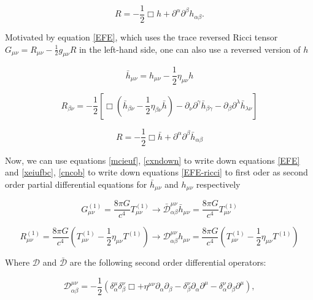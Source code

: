\begin{equation}\label{cxndown}
R = -\frac{1}{2} \Box h + \partial^{\alpha}\partial^{\beta} h_{\alpha \beta}.
\end{equation}

Motivated by equation \ref{EFE},  which uses the trace reversed Ricci tensor $G_{\mu \nu}= R_{\mu\nu}-\frac{1}{2} g_{\mu\nu} R$ in the left-hand side, one can also use a reversed version of $h$


\begin{equation}
\bar{h}_{\mu\nu} = h_{\mu\nu}-\frac{1}{2} \eta_{\mu\nu} h
\end{equation}

\begin{equation}\label{xeiufbc}
R_{\beta \nu} = -\frac{1}{2} [ \Box( \bar{h}_{\beta \nu}-\frac{1}{2} \eta_{\beta \nu} \bar{h} ) - \partial_{\nu} \partial^{\gamma} \bar{h}_{\beta \gamma} - \partial_{\beta} \partial^{\lambda} \bar{h}_{\lambda \nu} ]
\end{equation}

\begin{equation}\label{cncob}
R = -\frac{1}{2} \Box \bar{h} + \partial^{\alpha}\partial^{\beta} \bar{h}_{\alpha \beta}
\end{equation}


Now, we can use equations \ref{mcieuf}, \ref{cxndown} to write down equations \ref{EFE} and  \ref{xeiufbc}, \ref{cncob} to write down equations \ref{EFE-ricci} to first oder as second order partial differential equations for $\bar{h}_{\mu \nu}$ and $h_{\mu\nu}$ respectively

\begin{equation}\label{hbar}
G^{(1)}_{\mu\nu} = \frac{8\pi G}{c^4} T^{(1)}_{\mu\nu} \rightarrow \bar{\mathcal{D}}^{\mu\nu}_{\alpha \beta} \bar{h}_{\mu\nu} = \frac{8\pi G}{c^4} T^{(1)}_{\mu\nu}
\end{equation}


\begin{equation}\label{h}
R^{(1)}_{\mu\nu} = \frac{8\pi G}{c^4}(T^{(1)}_{\mu\nu} - \frac{1}{2} \eta_{\mu\nu}T^{(1)}) \rightarrow \mathcal{D}^{\mu\nu}_{\alpha \beta} h_{\mu\nu} = \frac{8\pi G}{c^4}(T^{(1)}_{\mu\nu} - \frac{1}{2} \eta_{\mu\nu}T^{(1)})
\end{equation}


Where $\mathcal{D}$ and $\mathcal{\bar{D}}$ are the following second order differential operators:

\begin{equation}\label{D}
\mathcal{D}^{\mu\nu}_{\alpha \beta} = -\frac{1}{2}( \delta^{\mu}_{\alpha} \delta^{\nu}_{\beta} \Box + \eta^{\mu\nu}\partial_{\alpha}\partial_{\beta} - \delta^{\nu}_{\beta} \partial_{\alpha}\partial^{\mu} - \delta^{\nu}_{\alpha} \partial_{\beta}\partial^{\mu}),
\end{equation}

